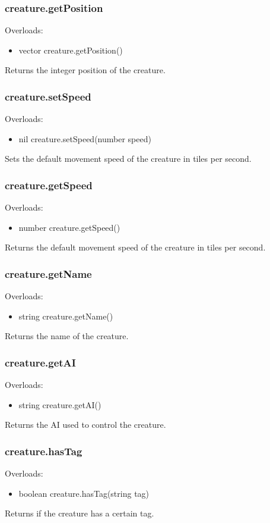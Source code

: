 \documentclass{book}
\newenvironment{ulist}
	{\begin{itemize}
			\itemsep0em}
	{\end{itemize}}
\begin{document}
\subsubsection{creature.getPosition}
Overloads:
\begin{ulist}
	\item vector creature.getPosition()
\end{ulist}
Returns the integer position of the creature.

\subsubsection{creature.setSpeed}
Overloads:
\begin{ulist}
	\item nil creature.setSpeed(number speed)
\end{ulist}
Sets the default movement speed of the creature in tiles per second.

\subsubsection{creature.getSpeed}
Overloads:
\begin{ulist}
	\item number creature.getSpeed()
\end{ulist}
Returns the default movement speed of the creature in tiles per second.

\subsubsection{creature.getName}
Overloads:
\begin{ulist}
	\item string creature.getName()
\end{ulist}
Returns the name of the creature.

\subsubsection{creature.getAI}
Overloads:
\begin{ulist}
	\item string creature.getAI()
\end{ulist}
Returns the AI used to control the creature.

\subsubsection{creature.hasTag}
Overloads:
\begin{ulist}
	\item boolean creature.hasTag(string tag)
\end{ulist}
Returns if the creature has a certain tag.
\end{document}
